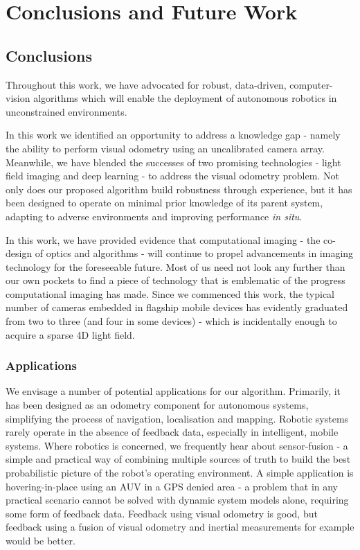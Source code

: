 \chapter{Conclusions and Future Work}


\section{Conclusions}
Throughout this work, we have advocated for robust, data-driven, computer-vision algorithms which will enable the deployment of autonomous robotics in unconstrained environments. 

In this work we identified an opportunity to address a knowledge gap - namely the ability to perform visual odometry using an uncalibrated camera array. Meanwhile, we have blended the successes of two promising technologies - light field imaging and deep learning - to address the visual odometry problem.  Not only does our proposed algorithm build robustness through experience, but it has been designed to operate on minimal prior knowledge of its parent system, adapting to adverse environments and improving performance \textit{in situ}. 

In this work, we have provided evidence that computational imaging - the co-design of optics and algorithms - will continue to propel advancements in imaging technology for the foreseeable future. Most of us need not look any further than our own pockets to find a piece of technology that is emblematic of the progress computational imaging has made. Since we commenced this work, the typical number of cameras embedded in flagship mobile devices has evidently graduated from two to three (and four in some devices) - which is incidentally enough to acquire a sparse 4D light field.

\subsection{Applications}
We envisage a number of potential applications for our algorithm. Primarily, it has been designed as an odometry component for autonomous systems, simplifying the process of navigation, localisation and mapping. Robotic systems rarely operate in the absence of feedback data, especially in intelligent, mobile systems. Where robotics is concerned, we frequently hear about sensor-fusion - a simple and practical way of combining multiple sources of truth to build the best probabilistic picture of the robot's operating environment. A simple application is hovering-in-place using an AUV in a GPS denied area - a problem that in any practical scenario cannot be solved with dynamic system models alone, requiring some form of feedback data. Feedback using visual odometry is good, but feedback using a fusion of visual odometry and inertial measurements for example would be better. 

